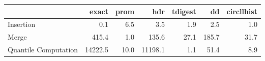 \begin{tabular}{lrrrrrr}
\toprule
{} &   exact &  prom &     hdr &  tdigest &    dd &  circllhist \\
\midrule
Insertion            &     0.1 &   6.5 &     3.5 &      1.9 &   2.5 &         1.0 \\
Merge                &   415.4 &   1.0 &   135.6 &     27.1 & 185.7 &        31.7 \\
Quantile Computation & 14222.5 &  10.0 & 11198.1 &      1.1 &  51.4 &         8.9 \\
\bottomrule
\end{tabular}
